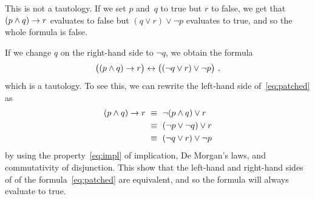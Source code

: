 \documentclass{jn-pset}
\begin{document}
\begin{problem}
\begin{solution}
  This is not a tautology.
  If we set $p$ and~$q$ to true
  but $r$ to false, we get that
  $
  (p \land q) \rightarrow r
  $
  evaluates to  false but
  $
  (q \lor r) \lor \lnot p
  $
  evaluates to true, and so the whole formula is false.

  If we change $q$ on the right-hand side to $\lnot q$,
  we obtain the formula
  \begin{equation}
    \label{eq:patched}
    \bigl(
    (p \land q) \rightarrow r
    \bigr)
    \leftrightarrow
    \bigl(
    (\lnot q \lor r) \lor \lnot p
    \bigr)
    \ ,
  \end{equation}    
  which is a tautology. To see this, we can rewrite the left-hand side
  of~\eqref{eq:patched}
  as
  \begin{subequations}
  \begin{align}
    (p \land q) \rightarrow r
    \ &\equiv \
        \lnot (p \land q) \lor r
    \\
    \ &\equiv \
        (\lnot p \lor \lnot q) \lor r
    \\
    \ &\equiv \
        (\lnot q \lor r) \lor \lnot p
  \end{align}
  \end{subequations}
  by using
  the property~\eqref{eq:impl} of implication,
  De Morgan's laws,
  and commutativity of disjunction.
  This show that the left-hand and right-hand sides of
  of the formula~\eqref{eq:patched} are equivalent,
  and so the formula will always evaluate to true.
\end{solution}

\end{problem}


\end{document}
